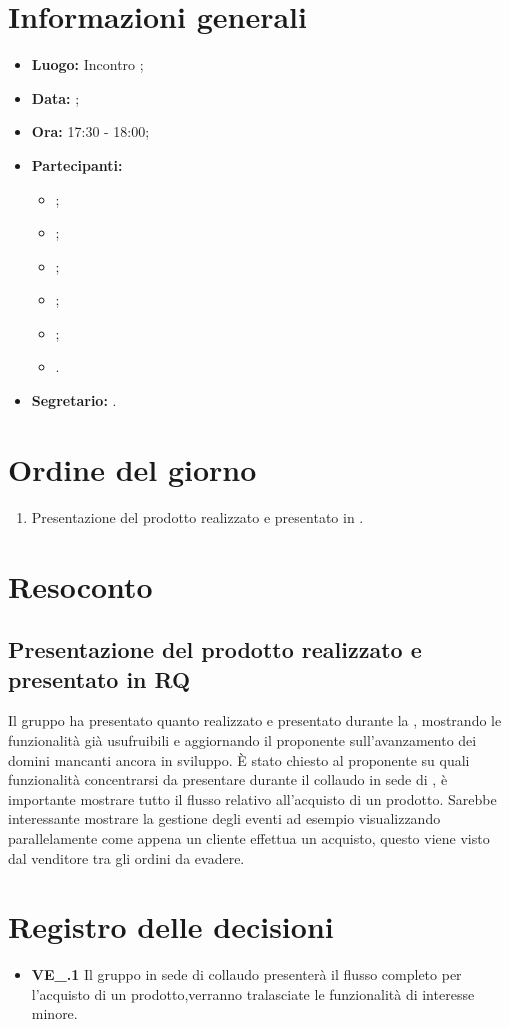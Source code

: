 \section{Informazioni generali}
\begin{itemize}
\item \textbf{Luogo:} Incontro ;
\item \textbf{Data:} \Data;
\item \textbf{Ora:} 17:30 - 18:00;
\item \textbf{Partecipanti:}
	\begin{itemize}
		\item \BL{}; 
		\item \FF{};
		\item \MM{};
		\item \TL{};
		\item \PC;
		\item \Proponente{}.
	\end{itemize}
\item \textbf{Segretario:} \FF{}.
\end{itemize}

\section{Ordine del giorno}
\begin{enumerate}
	\item Presentazione del prodotto realizzato e presentato in .
\end{enumerate}

\section{Resoconto}
\subsection{Presentazione del prodotto realizzato e presentato in RQ}
Il gruppo ha presentato quanto realizzato e presentato durante la , mostrando le funzionalità già usufruibili e aggiornando il proponente sull'avanzamento dei domini mancanti ancora in sviluppo. È stato chiesto al proponente su quali funzionalità concentrarsi da presentare durante il collaudo in sede di , è importante mostrare tutto il flusso relativo all'acquisto di un prodotto. Sarebbe interessante mostrare la gestione degli eventi ad esempio visualizzando parallelamente come appena un cliente effettua un acquisto, questo viene visto dal venditore tra gli ordini da evadere.  

\section{Registro delle decisioni}
\begin{itemize}
	\item \textbf{VE\_\Data.1} Il gruppo in sede di collaudo presenterà il flusso completo per l'acquisto di un prodotto,verranno tralasciate le funzionalità di interesse minore.
\end{itemize}